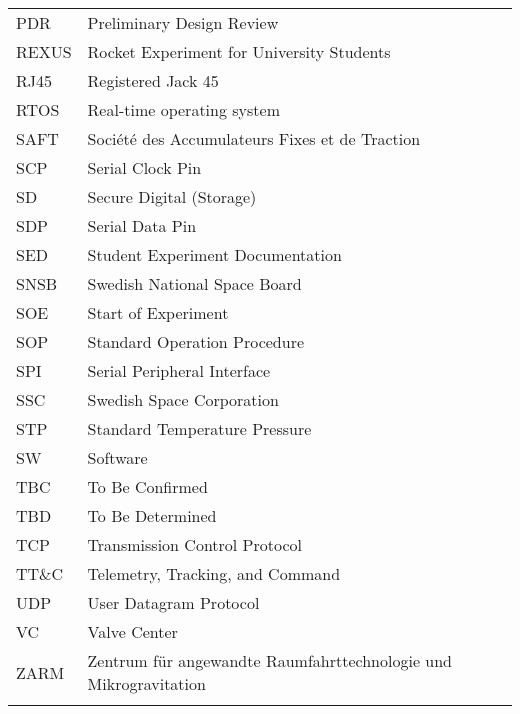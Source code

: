 \begin{longtable}{p{3cm} p{9cm}}
             PDR         & Preliminary Design Review\\
             REXUS       & Rocket Experiment for University Students \\
             RJ45        & Registered Jack 45 \\
             RTOS        & Real-time operating system\\
             SAFT        & Soci\'{e}t\'{e} des Accumulateurs Fixes et de Traction\\
             SCP         & Serial Clock Pin\\
             SD          & Secure Digital (Storage) \\
             SDP         & Serial Data Pin\\
             SED         & Student Experiment Documentation \\
             SNSB        & Swedish National Space Board \\
             SOE         & Start of Experiment\\
             SOP         & Standard Operation Procedure\\
             SPI         & Serial Peripheral Interface\\
             SSC         & Swedish Space Corporation \\
             STP         & Standard Temperature Pressure\\
             SW          & Software\\
             TBC         & To Be Confirmed\\
             TBD         & To Be Determined \\
             TCP         & Transmission Control Protocol\\
             TT$\&$C     & Telemetry, Tracking, and Command\\
             UDP         & User Datagram Protocol\\
             VC          & Valve Center\\
             ZARM        & Zentrum f{\"u}r angewandte Raumfahrttechnologie und Mikrogravitation \\
         \label{tab:abbrevi}
     \end{longtable}
     \raggedbottom
